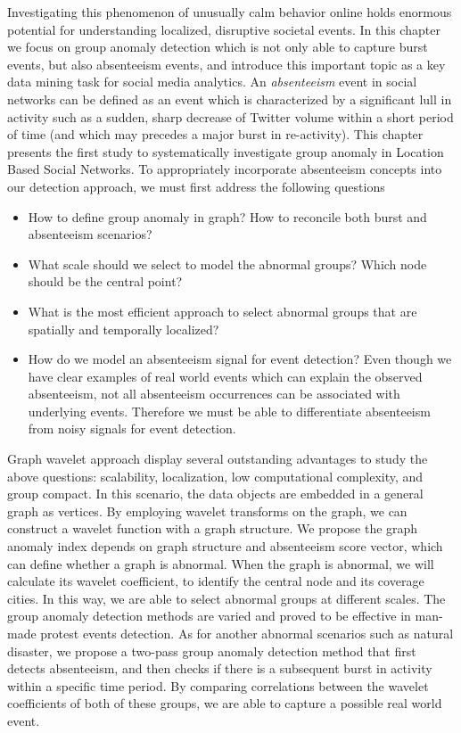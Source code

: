 Investigating this phenomenon of unusually calm behavior online holds enormous potential for understanding localized, disruptive societal events.
In this chapter we focus on group anomaly detection which is not only able to capture burst events, but also absenteeism events, and introduce this important topic as a key data mining task for social media analytics.
An \textit{absenteeism} event in social networks can be defined as an event which is characterized by a significant lull in activity such as a sudden, sharp decrease of Twitter volume within a short period of time (and which may precedes a major burst in re-activity).
This chapter presents the first study to systematically investigate group anomaly in Location Based Social Networks.
To appropriately incorporate absenteeism concepts into our detection approach, we must first address the following questions
\begin{itemize}
\item How to define group anomaly in graph? How to reconcile both burst and absenteeism scenarios?
\item What scale should we select to model the abnormal groups? Which node should be the central point?
\item What is the most efficient approach to select abnormal groups that are spatially and temporally localized?
\item How do we model an absenteeism signal for event detection? Even though we have clear examples of real world events which can explain the observed absenteeism, not all absenteeism occurrences can be associated with underlying events. Therefore we must be able to differentiate absenteeism from noisy signals for event detection.
\end{itemize}

Graph wavelet approach display several outstanding advantages to study the above
questions: scalability, localization, low computational complexity, and group compact. In this scenario, the data objects are embedded in a general graph as vertices.
By employing wavelet transforms on the graph, we can construct a wavelet function with a graph structure. We propose the graph anomaly index depends on graph structure and absenteeism score vector, which can define whether a graph is abnormal. When the graph is abnormal, we will calculate its wavelet coefficient, to identify the central node and its coverage cities. In this way, we are able to select abnormal groups at different scales. The group anomaly detection methods are varied and proved to be effective in man-made protest events detection. As for another abnormal scenarios such as natural disaster, we propose a two-pass group anomaly detection method that first detects absenteeism, and then checks if there is a subsequent burst in activity within a specific time period. By comparing correlations between the wavelet coefficients of both of these groups, we are able to capture a possible real world event.

